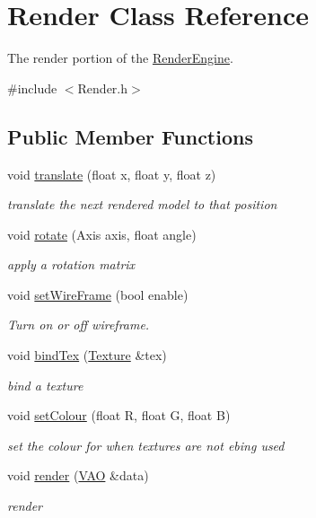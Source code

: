 \hypertarget{class_render}{\section{Render Class Reference}
\label{class_render}
}


The render portion of the \hyperlink{class_render_engine}{Render\-Engine}.  




{\ttfamily \#include $<$Render.\-h$>$}

\subsection*{Public Member Functions}
\begin{DoxyCompactItemize}
\item 
void \hyperlink{class_render_a3685dee198801656d82b3597c0995a5f}{translate} (float x, float y, float z)
\begin{DoxyCompactList}\small\item\em translate the next rendered model to that position \end{DoxyCompactList}\item 
void \hyperlink{class_render_ac4c31c973bb8a82f965cc5a8c8d81f22}{rotate} (Axis axis, float angle)
\begin{DoxyCompactList}\small\item\em apply a rotation matrix \end{DoxyCompactList}\item 
void \hyperlink{class_render_a425bc40a7f1af78b41bc913ab9613cd4}{set\-Wire\-Frame} (bool enable)
\begin{DoxyCompactList}\small\item\em Turn on or off wireframe. \end{DoxyCompactList}\item 
void \hyperlink{class_render_ab498aa4c187f5c3d4e1479b94d86f161}{bind\-Tex} (\hyperlink{class_texture}{Texture} \&tex)
\begin{DoxyCompactList}\small\item\em bind a texture \end{DoxyCompactList}\item 
void \hyperlink{class_render_a05951fdb27e9ad1fbc28be2c682aaf12}{set\-Colour} (float R, float G, float B)
\begin{DoxyCompactList}\small\item\em set the colour for when textures are not ebing used \end{DoxyCompactList}\item 
void \hyperlink{class_render_a09b3ee0ca3c35661a942ba46d3aedd75}{render} (\hyperlink{class_v_a_o}{V\-A\-O} \&data)
\begin{DoxyCompactList}\small\item\em render \end{DoxyCompactList}\end{DoxyCompactItemize}


